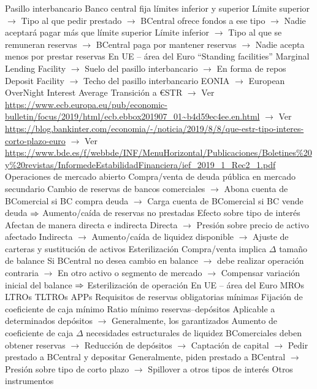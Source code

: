 \documentclass{nuevotema}
\begin{document}
\begin{esquemal}
				\4 Pasillo interbancario
				\4[] Banco central fija límites inferior y superior
				\4[] Límite superior
				\4[] $\to$ Tipo al que pedir prestado
				\4[] $\to$ BCentral ofrece fondos a ese tipo
				\4[] $\to$ Nadie aceptará pagar más que límite superior
				\4[] Límite inferior
				\4[] $\to$ Tipo al que se remuneran reservas
				\4[] $\to$ BCentral paga por mantener reservas
				\4[] $\to$ Nadie acepta menos por prestar reservas
				\4 En UE -- área del Euro
				\4[] ``Standing facilities''
				\4[] Marginal Lending Facility
				\4[] $\to$ Suelo del pasillo interbancario
				\4[] $\to$ En forma de repos
				\4[] Deposit Facility
				\4[] $\to$ Techo del pasillo interbancario
				\4[] EONIA
				\4[] $\to$ European OverNight Interest Average
				\4[] Transición a €STR
				\4[] $\to$ Ver \url{https://www.ecb.europa.eu/pub/economic-bulletin/focus/2019/html/ecb.ebbox201907_01~b4d59ec4ee.en.html}
				\4[] $\to$  Ver \url{https://blog.bankinter.com/economia/-/noticia/2019/8/8/que-estr-tipo-interes-corto-plazo-euro}
				\4[] $\to$  Ver \url{https://www.bde.es/f/webbde/INF/MenuHorizontal/Publicaciones/Boletines\%20y\%20revistas/InformedeEstabilidadFinanciera/ief_2019_1_Rec2_1.pdf}
			\3 Operaciones de mercado abierto
				\4 Compra/venta de deuda pública en mercado secundario
				\4[] Cambio de reservas de bancos comerciales
				\4[] $\to$ Abona cuenta de BComercial si BC compra deuda
				\4[] $\to$ Carga cuenta de BComercial si BC vende deuda
				\4[] $\Rightarrow$ Aumento/caída de reservas no prestadas
				\4 Efecto sobre tipo de interés
				\4[] Afectan de manera directa e indirecta
				\4[] Directa
				\4[] $\to$ Presión sobre precio de activo afectado
				\4[] Indirecta
				\4[] $\to$ Aumento/caída de liquidez disponible
				\4[] $\to$ Ajuste de carteras y sustitución de activos
				\4 Esterilización
				\4[] Compra/venta implica $\Delta$ tamaño de balance
				\4[] Si BCentral no desea cambio en balance
				\4[] $\to$ debe realizar operación contraria
				\4[] $\to$ En otro activo o segmento de mercado
				\4[] $\to$ Compensar variación inicial del balance
				\4[] $\Rightarrow$ Esterilización de operación
				\4 En UE -- área del Euro
				\4[] MROs
				\4[] LTROs
				\4[] TLTROs
				\4[] APPs
			\3 Requisitos de reservas obligatorias mínimas
				\4 Fijación de coeficiente de caja mínimo
				\4[] Ratio mínimo reservas--depósitos
				\4 Aplicable a determinados depósitos
				\4[] $\to$ Generalmente, los garantizados
				\4 Aumento de coeficiente de caja
				\4[] $\Delta$ necesidades estructurales de liquidez
				\4[] BComerciales deben obtener reservas
				\4[] $\to$ Reducción de depósitos
				\4[] $\to$ Captación de capital
				\4[] $\to$ Pedir prestado a BCentral y depositar
				\4[] Generalmente, piden prestado a BCentral
				\4[] $\to$ Presión sobre tipo de corto plazo
				\4[] $\to$ Spillover a otros tipos de interés
			\3 Otros instrumentos
				

\end{esquemal}
\end{document}
